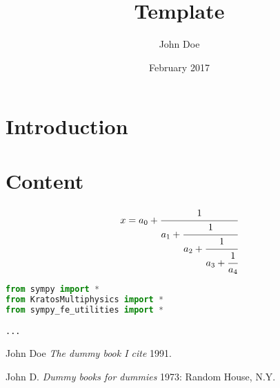 \documentclass[a4paper,10pt]{article} %
\title{Template}
\author{John Doe}
\date{February 2017}
\begin{document}
\maketitle

\section{Introduction}

\lipsum[1-1]

\section{Content}

\lipsum[1-1]

\begin{equation}\label{eq:eq1}
  x = a_0 + \cfrac{1}{a_1 
          + \cfrac{1}{a_2 
          + \cfrac{1}{a_3 + \cfrac{1}{a_4} } } }
\end{equation}

\lipsum[1-1]

\begin{lstlisting}[language=Python]
from sympy import *
from KratosMultiphysics import *
from sympy_fe_utilities import *

...

\end{lstlisting}

\begin{thebibliography}{99}

 John Doe {\em The dummy book I cite}  1991.

  John D. {\em Dummy books for dummies} 1973:
Random House, N.Y.

\end{thebibliography}
\end{document}

